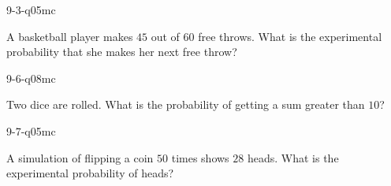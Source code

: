 \begin{practiceQuestion}{9-3-q05}{mc}
\begin{questionText}
A basketball player makes $45$ out of $60$ free throws. What is the experimental probability that she makes her next free throw?
\end{questionText}
\end{practiceQuestion}

\begin{practiceQuestion}{9-6-q08}{mc}
\begin{questionText}
Two dice are rolled. What is the probability of getting a sum greater than $10$?
\end{questionText}
\end{practiceQuestion}

\begin{practiceQuestion}{9-7-q05}{mc}
\begin{questionText}
A simulation of flipping a coin $50$ times shows $28$ heads. What is the experimental probability of heads?
\end{questionText}
\end{practiceQuestion}
